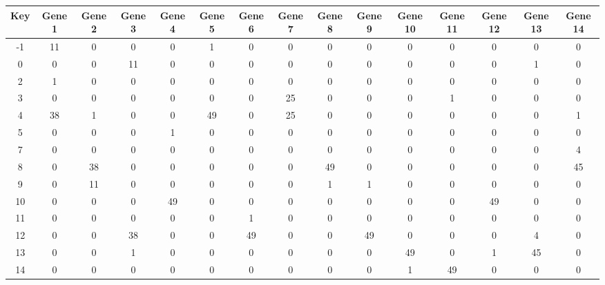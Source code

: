 \begin{tabular}{|c|c|c|c|c|c|c|c|c|c|c|c|c|c|c|}
\hline
Key & Gene 1 & Gene 2 & Gene 3 & Gene 4 & Gene 5 & Gene 6 & Gene 7 & Gene 8 & Gene 9 & Gene 10 & Gene 11 & Gene 12 & Gene 13 & Gene 14 \\
\hline
-1 & 11 & 0 & 0 & 0 & 1 & 0 & 0 & 0 & 0 & 0 & 0 & 0 & 0 & 0 \\
0 & 0 & 0 & 11 & 0 & 0 & 0 & 0 & 0 & 0 & 0 & 0 & 0 & 1 & 0 \\
2 & 1 & 0 & 0 & 0 & 0 & 0 & 0 & 0 & 0 & 0 & 0 & 0 & 0 & 0 \\
3 & 0 & 0 & 0 & 0 & 0 & 0 & 25 & 0 & 0 & 0 & 1 & 0 & 0 & 0 \\
4 & 38 & 1 & 0 & 0 & 49 & 0 & 25 & 0 & 0 & 0 & 0 & 0 & 0 & 1 \\
5 & 0 & 0 & 0 & 1 & 0 & 0 & 0 & 0 & 0 & 0 & 0 & 0 & 0 & 0 \\
7 & 0 & 0 & 0 & 0 & 0 & 0 & 0 & 0 & 0 & 0 & 0 & 0 & 0 & 4 \\
8 & 0 & 38 & 0 & 0 & 0 & 0 & 0 & 49 & 0 & 0 & 0 & 0 & 0 & 45 \\
9 & 0 & 11 & 0 & 0 & 0 & 0 & 0 & 1 & 1 & 0 & 0 & 0 & 0 & 0 \\
10 & 0 & 0 & 0 & 49 & 0 & 0 & 0 & 0 & 0 & 0 & 0 & 49 & 0 & 0 \\
11 & 0 & 0 & 0 & 0 & 0 & 1 & 0 & 0 & 0 & 0 & 0 & 0 & 0 & 0 \\
12 & 0 & 0 & 38 & 0 & 0 & 49 & 0 & 0 & 49 & 0 & 0 & 0 & 4 & 0 \\
13 & 0 & 0 & 1 & 0 & 0 & 0 & 0 & 0 & 0 & 49 & 0 & 1 & 45 & 0 \\
14 & 0 & 0 & 0 & 0 & 0 & 0 & 0 & 0 & 0 & 1 & 49 & 0 & 0 & 0 \\
\hline
\end{tabular}